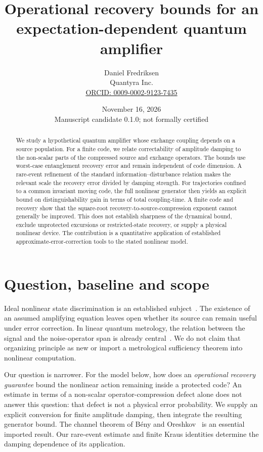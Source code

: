 \documentclass[11pt]{article}
\title{Operational recovery bounds for an expectation-dependent quantum amplifier}
\author{Daniel Fredriksen\\Quantyra Inc.\\\small\href{https://orcid.org/0009-0002-9123-7435}{ORCID: 0009-0002-9123-7435}}
\date{November 16, 2026\\\small Manuscript candidate 0.1.0; not formally certified}
\begin{document}
\maketitle
\begin{abstract}
We study a hypothetical quantum amplifier whose exchange coupling depends on a source population. For a finite code, we relate correctability of amplitude damping to the non-scalar parts of the compressed source and exchange operators. The bounds use worst-case entanglement recovery error and remain independent of code dimension. A rare-event refinement of the standard information--disturbance relation makes the relevant scale the recovery error divided by damping strength. For trajectories confined to a common invariant moving code, the full nonlinear generator then yields an explicit bound on distinguishability gain in terms of total coupling-time. A finite code and recovery show that the square-root recovery-to-source-compression exponent cannot generally be improved. This does not establish sharpness of the dynamical bound, exclude unprotected excursions or restricted-state recovery, or supply a physical nonlinear device. The contribution is a quantitative application of established approximate-error-correction tools to the stated nonlinear model.
\end{abstract}

\section{Question, baseline and scope}
Ideal nonlinear state discrimination is an established subject~\cite{ChildsYoung}. The existence of an assumed amplifying equation leaves open whether its source can remain useful under error correction. In linear quantum metrology, the relation between the signal and the noise-operator span is already central~\cite{ZhouEtAl,ZhouJiang}. We do not claim that organizing principle as new or import a metrological sufficiency theorem into nonlinear computation.

Our question is narrower. For the model below, how does an \emph{operational recovery guarantee} bound the nonlinear action remaining inside a protected code? An estimate in terms of a non-scalar operator-compression defect alone does not answer this question: that defect is not a physical error probability. We supply an explicit conversion for finite amplitude damping, then integrate the resulting generator bound. The channel theorem of B\'eny and Oreshkov~\cite{BenyOreshkov} is an essential imported result. Our rare-event estimate and finite Kraus identities determine the damping dependence of its application.
\end{document}

